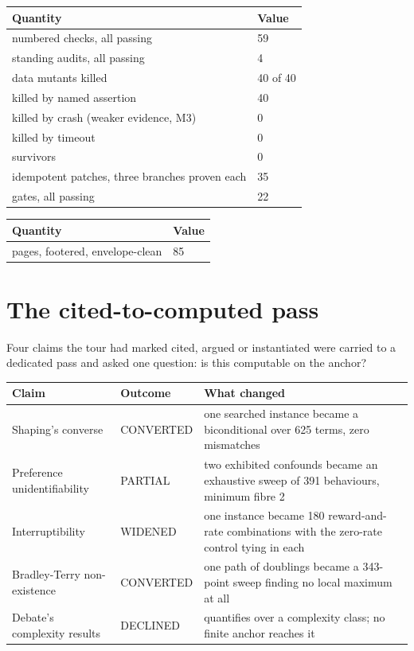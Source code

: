 \noindent
\begin{tabularx}{\textwidth}{Xl}
\toprule
Quantity & Value \\
\midrule
numbered checks, all passing & 59 \\
standing audits, all passing & 4 \\
data mutants killed & 40 of 40 \\
killed by named assertion & 40 \\
killed by crash (weaker evidence, M3) & 0 \\
killed by timeout & 0 \\
survivors & 0 \\
idempotent patches, three branches proven each & 35 \\
gates, all passing & 22 \\
\bottomrule
\end{tabularx}
\par\medskip
\noindent
\begin{tabularx}{\textwidth}{Xl}
\toprule
Quantity & Value \\
\midrule
pages, footered, envelope-clean & 85 \\
\bottomrule
\end{tabularx}
\par\medskip

\section*{The cited-to-computed pass}

Four claims the tour had marked cited, argued or instantiated were carried to a dedicated pass and asked one question: is this computable on the anchor?

\noindent

\noindent
\begin{tabularx}{\textwidth}{XXX}
\toprule
Claim & Outcome & What changed \\
\midrule
Shaping's converse & CONVERTED & one searched instance became a biconditional over 625 terms, zero mismatches \\
Preference unidentifiability & PARTIAL & two exhibited confounds became an exhaustive sweep of 391 behaviours, minimum fibre 2 \\
Interruptibility & WIDENED & one instance became 180 reward-and-rate combinations with the zero-rate control tying in each \\
Bradley-Terry non-existence & CONVERTED & one path of doublings became a 343-point sweep finding no local maximum at all \\
Debate's complexity results & DECLINED & quantifies over a complexity class; no finite anchor reaches it \\
\bottomrule
\end{tabularx}
\par\medskip

